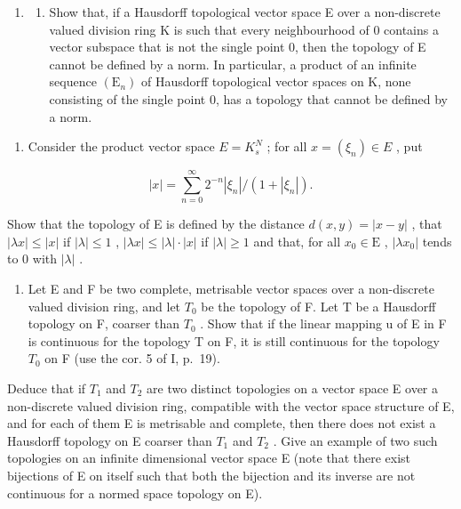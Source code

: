 \begin{enumerate}
\def\labelenumi{\arabic{enumi})}
\tightlist
\item
  \begin{enumerate}
  \def\labelenumii{\alph{enumii})}
  \tightlist
  \item
    Show that, if a Hausdorff topological vector space E over a non-discrete valued division ring K is such that every neighbourhood of 0 contains a vector subspace that is not the single point 0, then the topology of E cannot be defined by a norm. In particular, a product of an infinite sequence \((\mathrm{E}_{n})\) of Hausdorff topological vector spaces on K, none consisting of the single point 0, has a topology that cannot be defined by a norm.
  \end{enumerate}
\end{enumerate}

\begin{enumerate}
\def\labelenumi{\alph{enumi})}
\setcounter{enumi}{1}
\tightlist
\item
  Consider the product vector space \(E = K_{s}^{N}\) ; for all \(x = (\xi_{n}) \in E\) , put
\end{enumerate}

\[
| x | = \sum_ {n = 0} ^ {\infty} 2 ^ {- n} \left| \xi_ {n} \right| / (1 + | \xi_ {n} |).
\]

Show that the topology of E is defined by the distance \(d(x, y) = |x - y|\) , that \(|\lambda x| \leqslant |x|\) if \(|\lambda| \leqslant 1\) , \(|\lambda x| \leqslant |\lambda| \cdot |x|\) if \(|\lambda| \geqslant 1\) and that, for all \(x_0 \in \mathrm{E}\) , \(|\lambda x_0|\) tends to 0 with \(|\lambda|\) .

\begin{enumerate}
\def\labelenumi{\arabic{enumi})}
\setcounter{enumi}{1}
\tightlist
\item
  Let E and F be two complete, metrisable vector spaces over a non-discrete valued division ring, and let \(T_{0}\) be the topology of F. Let T be a Hausdorff topology on F, coarser than \(T_{0}\) . Show that if the linear mapping u of E in F is continuous for the topology T on F, it is still continuous for the topology \(T_{0}\) on F (use the cor. 5 of I, p.~19).
\end{enumerate}

Deduce that if \(T_{1}\) and \(T_{2}\) are two distinct topologies on a vector space E over a non-discrete valued division ring, compatible with the vector space structure of E, and for each of them E is metrisable and complete, then there does not exist a Hausdorff topology on E coarser than \(T_{1}\) and \(T_{2}\) . Give an example of two such topologies on an infinite dimensional vector space E (note that there exist bijections of E on itself such that both the bijection and its inverse are not continuous for a normed space topology on E).

